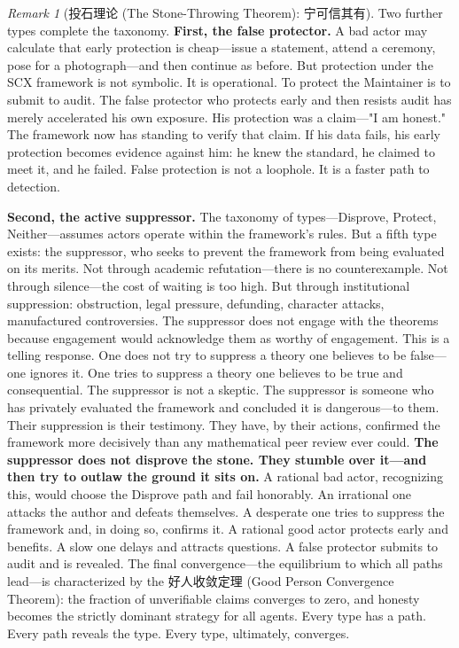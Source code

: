 \documentclass[12pt,a4paper]{ctexart}
\theoremstyle{definition}
\theoremstyle{remark}
\newtheorem{remark}{Remark}[section]
\begin{document}
\begin{remark}[投石理论 (The Stone-Throwing Theorem): 宁可信其有]
Two further types complete the taxonomy. \textbf{First, the false protector.} A bad actor may calculate that early protection is cheap—issue a statement, attend a ceremony, pose for a photograph—and then continue as before. But protection under the SCX framework is not symbolic. It is operational. To protect the Maintainer is to submit to audit. The false protector who protects early and then resists audit has merely accelerated his own exposure. His protection was a claim—"I am honest." The framework now has standing to verify that claim. If his data fails, his early protection becomes evidence against him: he knew the standard, he claimed to meet it, and he failed. False protection is not a loophole. It is a faster path to detection.

\textbf{Second, the active suppressor.} The taxonomy of types—Disprove, Protect, Neither—assumes actors operate within the framework's rules. But a fifth type exists: the suppressor, who seeks to prevent the framework from being evaluated on its merits. Not through academic refutation—there is no counterexample. Not through silence—the cost of waiting is too high. But through institutional suppression: obstruction, legal pressure, defunding, character attacks, manufactured controversies. The suppressor does not engage with the theorems because engagement would acknowledge them as worthy of engagement. This is a telling response. One does not try to suppress a theory one believes to be false—one ignores it. One tries to suppress a theory one believes to be true and consequential. The suppressor is not a skeptic. The suppressor is someone who has privately evaluated the framework and concluded it is dangerous—to them. Their suppression is their testimony. They have, by their actions, confirmed the framework more decisively than any mathematical peer review ever could. \textbf{The suppressor does not disprove the stone. They stumble over it—and then try to outlaw the ground it sits on.} A rational bad actor, recognizing this, would choose the Disprove path and fail honorably. An irrational one attacks the author and defeats themselves. A desperate one tries to suppress the framework and, in doing so, confirms it. A rational good actor protects early and benefits. A slow one delays and attracts questions. A false protector submits to audit and is revealed. The final convergence—the equilibrium to which all paths lead—is characterized by the 好人收敛定理 (Good Person Convergence Theorem): the fraction of unverifiable claims converges to zero, and honesty becomes the strictly dominant strategy for all agents. Every type has a path. Every path reveals the type. Every type, ultimately, converges.
\end{remark}
\end{document}
